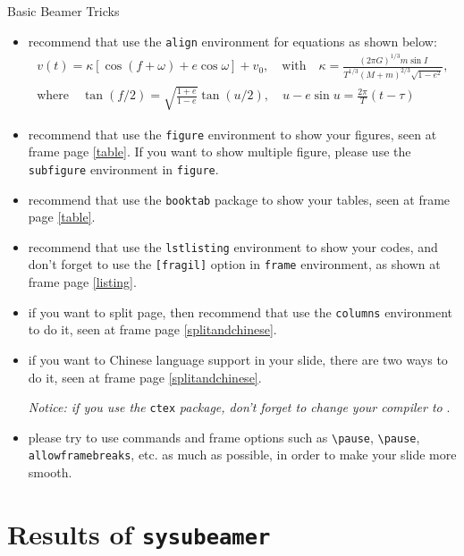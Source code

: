 \documentclass{beamer}
\begin{document}
\begin{frame}[allowframebreaks]{Basic Beamer Tricks}
    \begin{itemize}
        \item recommend that use the \texttt{align} environment for equations as shown below:
        \begin{align}
            v(t) = \kappa\left[\cos(f+\omega)+e\cos\omega\right] + v_0, \quad \text{with} \quad \kappa=\frac{(2\pi G)^{1/3}m\sin I}{T^{1/3}(M+m)^{2/3}\sqrt{1-e^2}}, \nonumber \\
            \text{where} \quad \tan(f/2)=\sqrt{\frac{1+e}{1-e}}\tan(u/2), \quad u-e\sin u = \frac{2\pi}{T}(t-\tau) \nonumber
        \end{align}
         \item recommend that use the \texttt{figure} environment to show your figures, seen at frame page \ref{table}. If you want to show multiple figure, please use the \texttt{subfigure} environment in \texttt{figure}.
        \item recommend that use the \texttt{booktab} package to show your tables, seen at frame page \ref{table}.
        \item recommend that use the \texttt{lstlisting} environment to show your codes, and don't forget to use the \texttt{[fragil]} option in \texttt{frame} environment, as shown at frame page \ref{listing}.
        \item if you want to split page, then recommend that use the \texttt{columns} environment to do it, seen at frame page \ref{splitandchinese}.
        \item if you want to Chinese language support in your slide, there are two ways to do it, seen at frame page \ref{splitandchinese}.
        
        \textit{Notice: if you use the} \texttt{ctex} \textit{package, don't forget to change your compiler to} .

        \item please try to use commands and frame options such as \texttt{\textbackslash pause}, \texttt{\textbackslash pause}, \texttt{allowframebreaks}, etc. as much as possible, in order to make your slide more smooth.
    \end{itemize}
\end{frame}

\section{Results of \texttt{sysubeamer}}
\end{document}
